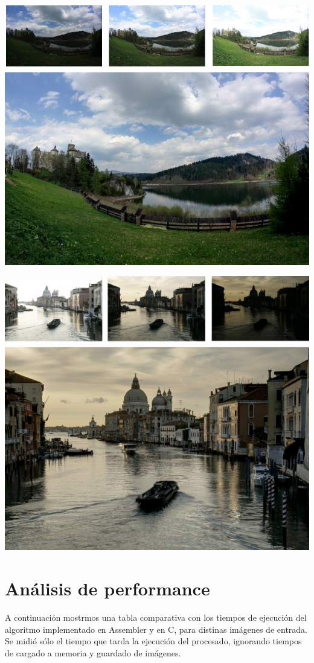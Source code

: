 \documentclass[a4paper,10pt]{article}
\begin{document}
        \includegraphics[width=\textwidth]{fused3.jpg}
        
        \includegraphics[width=\textwidth]{fused4.jpg}

    \section{Análisis de performance}
    
        A continuación mostrmos una tabla comparativa con los tiempos de ejecución del algoritmo implementado en Assembler y en C, para distinas imágenes de entrada. Se midió sólo el tiempo que tarda la ejecución del procesado, ignorando tiempos de cargado a memoria y guardado de imágenes.
\end{document}
